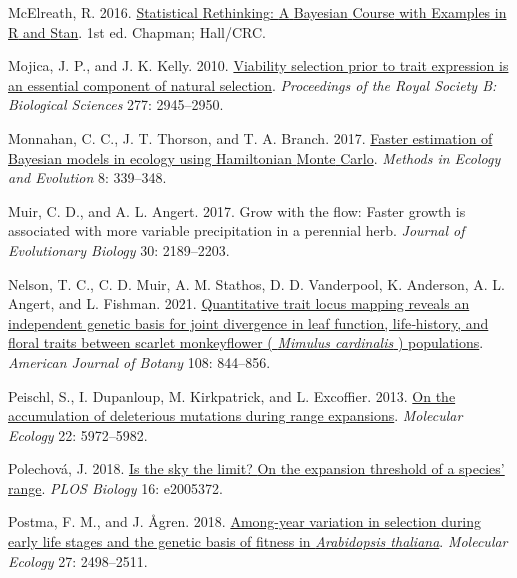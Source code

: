 \documentclass[
  12pt,
]{article}
\newlength{\cslhangindent}
\newlength{\cslentryspacingunit} %
\newenvironment{CSLReferences}[2] %
 {%
  \setlength{\parindent}{0pt}
  \ifodd #1
  \let\oldpar\par
  \def\par{\hangindent=\cslhangindent\oldpar}
  \fi
  \setlength{\parskip}{#2\cslentryspacingunit}
 }%
 {}
\begin{document}
\begin{CSLReferences}{1}{0}
\leavevmode{}%
McElreath, R. 2016. \href{https://doi.org/10.1201/9781315372495}{Statistical {Rethinking}: {A} {Bayesian} {Course} with {Examples} in {R} and {Stan}}. 1st ed. Chapman; Hall/CRC.

\leavevmode{}%
Mojica, J. P., and J. K. Kelly. 2010. \href{https://doi.org/10.1098/rspb.2010.0568}{Viability selection prior to trait expression is an essential component of natural selection}. \emph{Proceedings of the Royal Society B: Biological Sciences} 277: 2945--2950.

\leavevmode{}%
Monnahan, C. C., J. T. Thorson, and T. A. Branch. 2017. \href{https://doi.org/10.1111/2041-210X.12681}{Faster estimation of {Bayesian} models in ecology using {Hamiltonian} {Monte} {Carlo}}. \emph{Methods in Ecology and Evolution} 8: 339--348.

\leavevmode{}%
Muir, C. D., and A. L. Angert. 2017. Grow with the flow: Faster growth is associated with more variable precipitation in a perennial herb. \emph{Journal of Evolutionary Biology} 30: 2189--2203.

\leavevmode{}%
Nelson, T. C., C. D. Muir, A. M. Stathos, D. D. Vanderpool, K. Anderson, A. L. Angert, and L. Fishman. 2021. \href{https://doi.org/10.1002/ajb2.1660}{Quantitative trait locus mapping reveals an independent genetic basis for joint divergence in leaf function, life‐history, and floral traits between scarlet monkeyflower ( \emph{{Mimulus} cardinalis} ) populations}. \emph{American Journal of Botany} 108: 844--856.

\leavevmode{}%
Peischl, S., I. Dupanloup, M. Kirkpatrick, and L. Excoffier. 2013. \href{https://doi.org/10.1111/mec.12524}{On the accumulation of deleterious mutations during range expansions}. \emph{Molecular Ecology} 22: 5972--5982.

\leavevmode{}%
Polechová, J. 2018. \href{https://doi.org/10.1371/journal.pbio.2005372}{Is the sky the limit? {On} the expansion threshold of a species' range}. \emph{PLOS Biology} 16: e2005372.

\leavevmode{}%
Postma, F. M., and J. Ågren. 2018. \href{https://doi.org/10.1111/mec.14697}{Among-year variation in selection during early life stages and the genetic basis of fitness in \emph{{Arabidopsis} thaliana}}. \emph{Molecular Ecology} 27: 2498--2511.


\end{CSLReferences}
\end{document}
